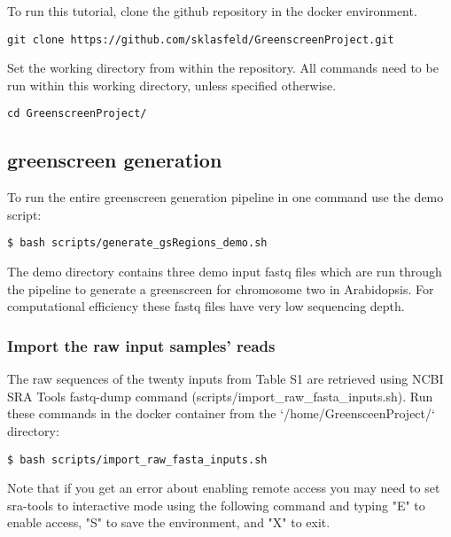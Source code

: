 \documentclass{article}
\begin{document}
\begin{sloppypar}
To run this tutorial, clone the github repository in the docker environment.

\begin{verbatim}
git clone https://github.com/sklasfeld/GreenscreenProject.git
\end{verbatim}

Set the working directory from within the repository. All commands need to be run within this working directory, unless specified otherwise.

\begin{verbatim}
cd GreenscreenProject/
\end{verbatim}

\subsection{greenscreen generation}

To run the entire greenscreen generation pipeline in one command use the demo script:

\begin{verbatim}
$ bash scripts/generate_gsRegions_demo.sh
\end{verbatim}

The demo directory contains three demo input fastq files which are run through the pipeline to generate a greenscreen for chromosome two in Arabidopsis. For computational efficiency these fastq files have very low sequencing depth.

\subsubsection{Import the raw input samples' reads}

The raw sequences of the twenty inputs from Table S1 are retrieved using NCBI SRA Tools fastq-dump command ({\selectfont scripts/import\_raw\_fasta\_inputs.sh}). Run these commands in the docker container from the `/home/GreensceenProject/` directory:

\begin{verbatim}
$ bash scripts/import_raw_fasta_inputs.sh
\end{verbatim}

Note that if you get an error about enabling remote access you may need to set sra-tools to interactive mode using the following command and typing "E" to enable access, "S" to save the environment, and "X" to exit. 


\end{sloppypar}
\end{document}
